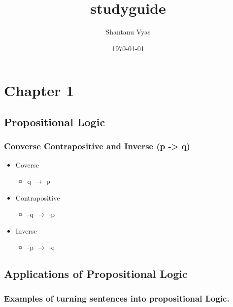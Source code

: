 \documentclass[11pt]{article}
\title{studyguide}
\author{Shantanu Vyas}
\date{\today}
\begin{document}
\maketitle

\setcounter{tocdepth}{3}
\tableofcontents
\vspace*{1cm}
\section{Chapter 1}
\label{sec-1}
\subsection{Propositional Logic}
\label{sec-1-1}
\subsubsection{Converse Contrapositive and Inverse (p -> q)}
\label{sec-1-1-1}
\begin{itemize}

\item Coverse
\label{sec-1-1-1-1}%
\begin{itemize}

\item q $\rightarrow$  p
\label{sec-1-1-1-1-1}%
\end{itemize} %

\item Contrapositive
\label{sec-1-1-1-2}%
\begin{itemize}

\item -q $\rightarrow$ -p
\label{sec-1-1-1-2-1}%
\end{itemize} %

\item Inverse
\label{sec-1-1-1-3}%
\begin{itemize}

\item -p $\rightarrow$ -q
\label{sec-1-1-1-3-1}%
\end{itemize} %
\end{itemize} %
\subsection{Applications of Propositional Logic}
\label{sec-1-2}
\subsubsection{Examples of turning sentences into propositional Logic.}
\label{sec-1-2-1}
\end{document}
